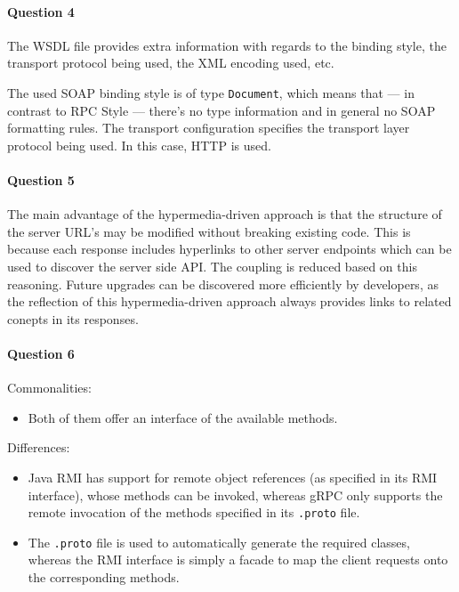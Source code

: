 \documentclass{ds-report}
\begin{document}
	\paragraph{Question 4} The WSDL file provides extra information with regards to the binding style, the transport protocol being used, the XML encoding used, etc. 
	
	The used SOAP binding style is of type \texttt{Document}, which means that --- in contrast to RPC Style --- there's no type information and in general no SOAP formatting rules. The transport configuration specifies the transport layer protocol being used. In this case, HTTP is used. 
	
	\paragraph{Question 5} The main advantage of the hypermedia-driven approach is that the structure of the server URL's may be modified without breaking existing code. This is because each response includes hyperlinks to other server endpoints which can be used to discover the server side API. The coupling is reduced based on this reasoning. Future upgrades can be discovered more efficiently by developers, as the reflection of this hypermedia-driven approach always provides links to related conepts in its responses.

	\paragraph{Question 6}
	Commonalities:
	\begin{itemize}
		\item Both of them offer an interface of the available methods.
		
	\end{itemize}
	Differences:
	\begin{itemize}
		\item Java RMI has support for remote object references (as specified in its RMI interface), whose methods can be invoked, whereas gRPC only supports the remote invocation of the methods specified in its \texttt{.proto} file.
		\item The \texttt{.proto} file is used to automatically generate the required classes, whereas the RMI interface is simply a facade to map the client requests onto the corresponding methods.
	\end{itemize}
\end{document}
